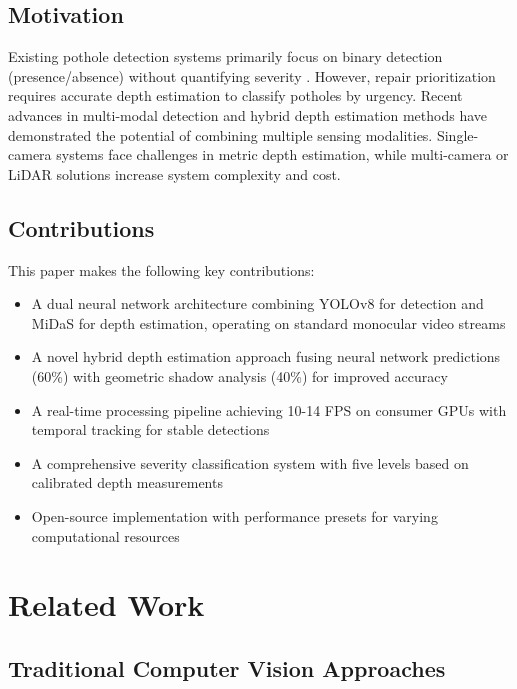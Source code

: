 \documentclass[conference]{IEEEtran}
\begin{document}
\subsection{Motivation}

Existing pothole detection systems primarily focus on binary detection (presence/absence) without quantifying severity \cite{kumar_yolov8}. However, repair prioritization requires accurate depth estimation to classify potholes by urgency. Recent advances in multi-modal detection \cite{shankar_multimodal} and hybrid depth estimation methods \cite{jindal_hybrid, baroudi_enhanced} have demonstrated the potential of combining multiple sensing modalities. Single-camera systems face challenges in metric depth estimation, while multi-camera or LiDAR solutions increase system complexity and cost.

\subsection{Contributions}

This paper makes the following key contributions:

\begin{itemize}
    \item A dual neural network architecture combining YOLOv8 for detection and MiDaS for depth estimation, operating on standard monocular video streams
    \item A novel hybrid depth estimation approach fusing neural network predictions (60\%) with geometric shadow analysis (40\%) for improved accuracy
    \item A real-time processing pipeline achieving 10-14 FPS on consumer GPUs with temporal tracking for stable detections
    \item A comprehensive severity classification system with five levels based on calibrated depth measurements
    \item Open-source implementation with performance presets for varying computational resources
\end{itemize}

\section{Related Work}

\subsection{Traditional Computer Vision Approaches}
\end{document}
